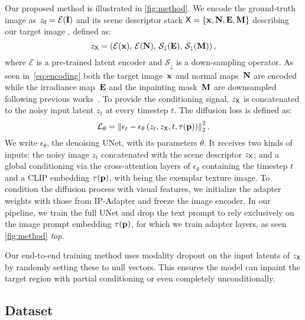 Our proposed method is illustrated in \cref{fig:method}. We encode the ground-truth image \image{} as $z_0 = \mathcal{E}(\mathbf{I})$ and its scene descriptor stack $\textsf{X}=\{\mathbf{x}, \mathbf{N}, \mathbf{E}, \mathbf{M}\}$ describing our target image \target, defined as:
\begin{equation}
    z_\textsf{X} = \left( \mathcal{E}(\mathbf{x}),\, \mathcal{E}(\mathbf{N}),\, \mathcal{S}_\downarrow(\mathbf{E}),\, \mathcal{S}_\downarrow(\mathbf{M}) \right),
    \label{eq:encoding}
\end{equation} 
where $\mathcal{E}$ is a pre-trained latent encoder and $\mathcal{S}_\downarrow$ is a down-sampling operator. As seen in~\cref{eq:encoding} both the target image~$\mathbf{x}$ and normal maps~$\mathbf{N}$ are encoded while the irradiance map~$\mathbf{E}$ and the inpainting mask~$\mathbf{M}$ are downsampled following previous works~\cite{zeng2024rgbx,rombach2021highresolution}.
To provide the conditioning signal, $z_\textsf{X}$ is concatenated to the noisy input latent $z_t$ at every timestep $t$. The diffusion loss is defined as:
\begin{equation}
    \mathcal{L}_{\theta} = \left\| \epsilon_t - \epsilon_{\theta} \left( z_t, z_\textsf{X}, t, \tau(\mathbf{p}) \right) \right\|^2_2.
\end{equation}
\noindent We write $\epsilon_{\theta}$, the denoising UNet, with its parameters $\theta$. It receives two kinds of inputs: the noisy image $z_t$ concatenated with the scene descriptor $z_\textsf{X}$; and a global conditioning via the cross-attention layers of $\epsilon_{\theta}$ containing the timestep $t$ and a CLIP embedding $\tau(\mathbf{p})$, with \exemplar being the exemplar texture image. To condition the diffusion process with visual features, we initialize the adapter weights with those from IP-Adapter \cite{ye2023ipadapter} and freeze the image encoder.
In our pipeline, we train the full UNet and drop the text prompt to rely exclusively on the image prompt embedding $\tau(\mathbf{p})$, for which we train adapter layers, as seen \cref{fig:method} \textit{top}.

Our end-to-end training method uses modality dropout on the input latents of $z_\textsf{X}$ \cite{zeng2024rgbx} by randomly setting these to null vectors. This ensures the model can inpaint the target region with partial conditioning or even completely unconditionally. 




\subsection{Dataset}
\label{sec:meth_dataset}

